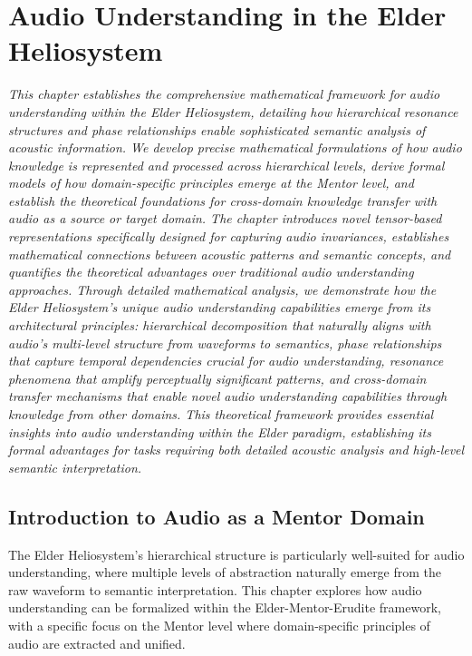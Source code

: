 \chapter{Audio Understanding in the Elder Heliosystem}

\textit{This chapter establishes the comprehensive mathematical framework for audio understanding within the Elder Heliosystem, detailing how hierarchical resonance structures and phase relationships enable sophisticated semantic analysis of acoustic information. We develop precise mathematical formulations of how audio knowledge is represented and processed across hierarchical levels, derive formal models of how domain-specific principles emerge at the Mentor level, and establish the theoretical foundations for cross-domain knowledge transfer with audio as a source or target domain. The chapter introduces novel tensor-based representations specifically designed for capturing audio invariances, establishes mathematical connections between acoustic patterns and semantic concepts, and quantifies the theoretical advantages over traditional audio understanding approaches. Through detailed mathematical analysis, we demonstrate how the Elder Heliosystem's unique audio understanding capabilities emerge from its architectural principles: hierarchical decomposition that naturally aligns with audio's multi-level structure from waveforms to semantics, phase relationships that capture temporal dependencies crucial for audio understanding, resonance phenomena that amplify perceptually significant patterns, and cross-domain transfer mechanisms that enable novel audio understanding capabilities through knowledge from other domains. This theoretical framework provides essential insights into audio understanding within the Elder paradigm, establishing its formal advantages for tasks requiring both detailed acoustic analysis and high-level semantic interpretation.}

\section{Introduction to Audio as a Mentor Domain}

The Elder Heliosystem's hierarchical structure is particularly well-suited for audio understanding, where multiple levels of abstraction naturally emerge from the raw waveform to semantic interpretation. This chapter explores how audio understanding can be formalized within the Elder-Mentor-Erudite framework, with a specific focus on the Mentor level where domain-specific principles of audio are extracted and unified.

